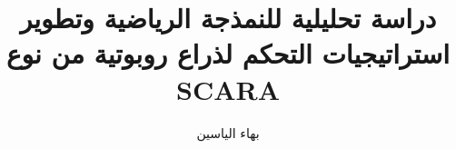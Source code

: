 \documentclass[12pt,a4paper,fleqn]{report}
\begin{document}


\title{ دراسة تحليلية  للنمذجة الرياضية وتطوير استراتيجيات التحكم لذراع روبوتية من نوع SCARA}

\author{بهاء الياسين}



\maketitle


 \clearpage %


\tableofcontents
\clearpage

















\end{document}
